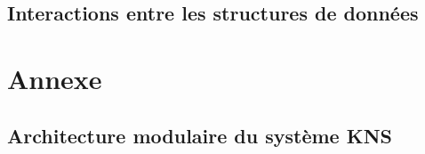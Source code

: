\documentclass[10pt,a4paper]{report}
\begin{document}
	\subsection{Interactions entre les structures de données} %

\newpage
\section{Annexe}

\subsection{Architecture modulaire du système KNS}
	\begin{center}
	\end{center}
\end{document}

